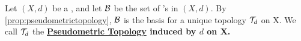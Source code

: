 \label{def:pseudometrictopology}
\newcommand{\PseudometricTopology}[0]{
    \bf \hyperref[def:pseudometrictopology]{Pseudometric Topology} \rm
}
\newcommand{\PseudometricInducedTopology}[0]{
    \bf \hyperref[def:pseudometrictopology]{Pseudometric Topology} \rm
}
\begin{df}
    Let $(X,d)$ be a \PseudometricSpace, and let $\mathcal{B}$ be the set of \OpenBall's in $(X,d)$. 
    By \ref{prop:pseudometrictopology}, $\mathcal{B}$ is the basis for a unique topology $\mathcal{T}_d$ on X. 
    We call $\mathcal{T}_d$ the \PseudometricInducedTopology induced by $d$ on X. 

\end{df}